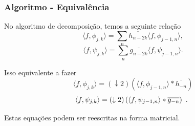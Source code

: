 \begin{frame}%
  \frametitle{Algoritmo - Equivalência}

  No algoritmo de decomposição, temos a seguinte relação
  \begin{equation}
  \langle f, \phi_{j,k} \rangle = \sum_{n} \overline{h_{n-2k}} \langle f, \phi_{j-1,n} \rangle ,
  \label{eq:algoritmo_rapido_mudanca_escala_1}
  \end{equation}
  \begin{equation}
  \langle f, \psi_{j,k} \rangle = \sum_{n} \overline{g_{n-2k}} \langle f, \psi_{j-1,n} \rangle .
  \label{eq:algoritmo_rapido_mudanca_escala_2}
  \end{equation}

  Isso equivalente a fazer
  \begin{equation}
  \langle f, \phi_{j,k} \rangle = (\downarrow 2) \left( \langle f, \phi_{j-1,n} \rangle \ast \overline{h_{-n}} \right)
  \label{eq:algoritmo_rapido_mudanca_escala_1a}
  \end{equation}
  \begin{equation}
  \langle f, \psi_{j,k} \rangle = (\downarrow 2) \left( \langle f, \psi_{j-1,n} \rangle \ast \overline{g_{-n}} \right) 
  \textmd{ . }
  \label{eq:algoritmo_rapido_mudanca_escala_2a}
  \end{equation}

  Estas equações podem ser reescritas na forma matricial.
\end{frame}

